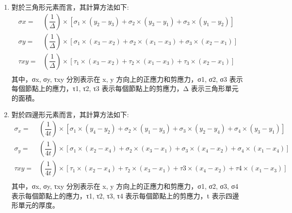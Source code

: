 \begin{enumerate}
\item 對於三角形元素而言，其計算方法如下:\
\[
\begin{aligned}
\sigma x=&\left( \dfrac{1}{\Delta }\right) \times \left[ \sigma _{1}\times \left( y_{2}-y_{3}\right) +\sigma _{2}\times \left( y_{3}-y_{1}\right) +\sigma _{3}\times \left( y_{1}-y_{2}\right) \right]\\
\sigma y=&\left( \dfrac{1}{\Delta }\right) \times \left[ \sigma _{1}\times \left( x_{3}-x_{2}\right) +\sigma _{2}\times \left( x_{1}-x_{3}\right) +\sigma _{3}\times \left( x_{2}-x_{1}\right) \right]\\
\tau xy=&\left( \dfrac{1}{\Delta }\right) \times \left[ \tau _{1}\times \left( x_{3}-x_{2}\right) +\tau _{2}\times \left( x_{1}-x_{3}\right) +\tau _{3}\times \left( x_{2}-x_{1}\right) \right]\\
\end{aligned}
\]
其中，σx, σy, τxy 分別表示在 x, y 方向上的正應力和剪應力，σ1, σ2, σ3 表示每個節點上的應力，τ1, τ2, τ3 表示每個節點上的剪應力，Δ 表示三角形單元的面積。\

\item 對於四邊形元素而言，其計算方法如下:\
\[
\begin{aligned}
\sigma _{x}=&\left( \dfrac{1}{4t}\right) \times \left[ \sigma _{1}\times \left( y_{4}-y_{2}\right) +\sigma _{2}\times \left( y_{1}-y_{3}\right) +\sigma _{3}\times \left( y_{2}-y_{4}\right) +\sigma _{4}\times \left( y_{3}-y_{1}\right) \right]\\
\sigma _{y}=&\left( \dfrac{1}{4t}\right) \times \left[ \sigma _{1}\times \left( x_{2}-x_{4}\right) +\sigma _{2}\times \left( x_{3}-x_{1}\right) +\sigma _{3}\times \left( x_{4}-x_{2}\right) +\sigma _{4}\times \left( x_{1}-x_{4}\right) \right]\\
\tau xy=&\left( \dfrac{1}{4t}\right) \times \left[ \tau _{1}\times \left( x_{2}-x_{4}\right) +\tau _{2}\times \left( x_{3}-x_{1}\right) +\tau 3\times \left( x_{4}-x_{2}\right) +\tau 4\times \left( x_{1}-x_{3}\right) \right]\\
\end{aligned}
\]
其中，σx, σy, τxy 分別表示在 x, y 方向上的正應力和剪應力，σ1, σ2, σ3, σ4 表示每個節點上的應力，τ1, τ2, τ3, τ4 表示每個節點上的剪應力，t 表示四邊形單元的厚度。
\end{enumerate}

